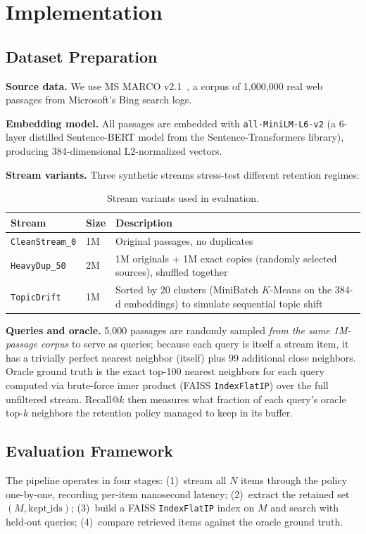 \documentclass[conference]{IEEEtran}
\begin{document}
\section{Implementation}

\subsection{Dataset Preparation}
\textbf{Source data.}
We use MS MARCO v2.1~\cite{b17}, a corpus of 1,000,000 real web
passages from Microsoft's Bing search logs.

\textbf{Embedding model.}
All passages are embedded with \texttt{all-MiniLM-L6-v2}
(a 6-layer distilled Sentence-BERT model from the
Sentence-Transformers library), producing
384-dimensional L2-normalized vectors.

\textbf{Stream variants.}
Three synthetic streams stress-test different retention regimes:

\begin{table}[h]
\centering
\caption{Stream variants used in evaluation.}
\label{tab:streams}
\begin{tabular}{@{}llp{4.2cm}@{}}
\toprule
Stream & Size & Description \\
\midrule
\texttt{CleanStream\_0}        & 1M & Original passages, no duplicates \\
\texttt{HeavyDup\_50}          & 2M & 1M originals + 1M exact copies (randomly selected sources), shuffled together \\
\texttt{TopicDrift}            & 1M & Sorted by 20 clusters (MiniBatch $K$-Means on the 384-d embeddings) to simulate sequential topic shift \\
\bottomrule
\end{tabular}
\end{table}

\textbf{Queries and oracle.}
5,000 passages are randomly sampled \emph{from the same 1M-passage
corpus} to serve as queries; because each query is itself a stream item,
it has a trivially perfect nearest neighbor (itself) plus 99 additional
close neighbors.
Oracle ground truth is the exact top-100 nearest neighbors for each
query computed via brute-force inner product
(FAISS \texttt{IndexFlatIP}) over the full unfiltered stream.
Recall@$k$ then measures what fraction of each query's oracle top-$k$
neighbors the retention policy managed to keep in its buffer.

\subsection{Evaluation Framework}
The pipeline operates in four stages: (1)~stream all $N$ items through
the policy one-by-one, recording per-item nanosecond latency;
(2)~extract the retained set $(M, \text{kept\_ids})$;
(3)~build a FAISS \texttt{IndexFlatIP} index on $M$ and search with
held-out queries; (4)~compare retrieved items against the oracle ground
truth.
\end{document}
